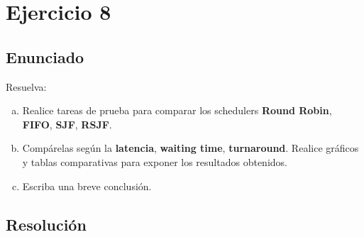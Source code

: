 \section{Ejercicio 8}

\subsection{Enunciado}
Resuelva:

\begin{enumerate}[a)]
\item Realice tareas de prueba para comparar los schedulers \textbf{Round Robin}, \textbf{FIFO}, \textbf{SJF}, \textbf{RSJF}.

\item Compárelas según la \textbf{latencia}, \textbf{waiting time}, \textbf{turnaround}.
\newline
Realice gráficos y tablas comparativas para exponer los resultados obtenidos.

\item Escriba una breve conclusión.

\end{enumerate}


\subsection{Resolución}